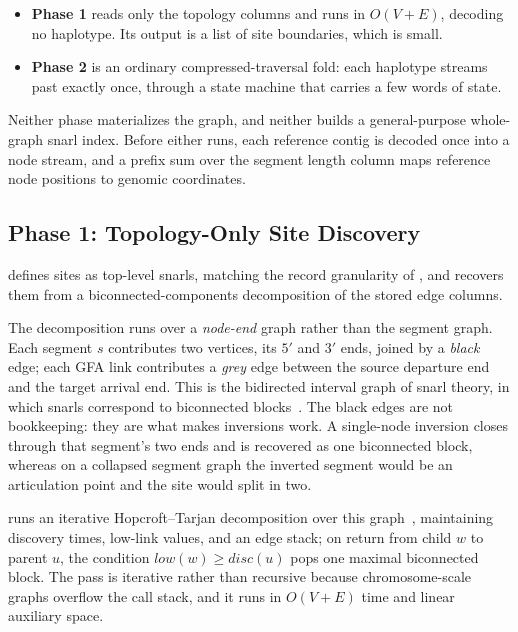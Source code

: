 \begin{itemize}[noitemsep,topsep=3pt,leftmargin=*]
  \item \textbf{Phase 1} reads only the topology columns and runs in $O(V{+}E)$,
        decoding no haplotype. Its output is a list of site boundaries, which is
        small.
  \item \textbf{Phase 2} is an ordinary compressed-traversal fold: each haplotype
        streams past exactly once, through a state machine that carries a few
        words of state.
\end{itemize}

Neither phase materializes the graph, and neither builds a general-purpose
whole-graph snarl index. Before either runs, each reference contig is decoded once
into a node stream, and a prefix sum over the segment length column maps reference
node positions to genomic coordinates.

\subsection{Phase 1: Topology-Only Site Discovery}
\label{subsec:dec-phase1}

\sys defines sites as top-level snarls, matching the record granularity of
, and recovers them from a biconnected-components
decomposition of the stored edge columns.

The decomposition runs over a \emph{node-end} graph rather than the segment graph.
Each segment $s$ contributes two vertices, its $5'$ and $3'$ ends, joined by a
\emph{black} edge; each GFA link contributes a \emph{grey} edge between the source
departure end and the target arrival end. This is the bidirected interval graph of
snarl theory, in which snarls correspond to biconnected
blocks~\cite{paten2018superbubbles}. The black edges are not bookkeeping: they are
what makes inversions work. A single-node inversion closes through that segment's
two ends and is recovered as one biconnected block, whereas on a collapsed segment
graph the inverted segment would be an articulation point and the site would split
in two.

\sys runs an iterative Hopcroft--Tarjan decomposition over this
graph~\cite{hopcroft1973algorithm}, maintaining discovery times, low-link values,
and an edge stack; on return from child $w$ to parent $u$, the condition
$\mathit{low}(w)\ge\mathit{disc}(u)$ pops one maximal biconnected block. The pass
is iterative rather than recursive because chromosome-scale graphs overflow the
call stack, and it runs in $O(V{+}E)$ time and linear auxiliary space.

